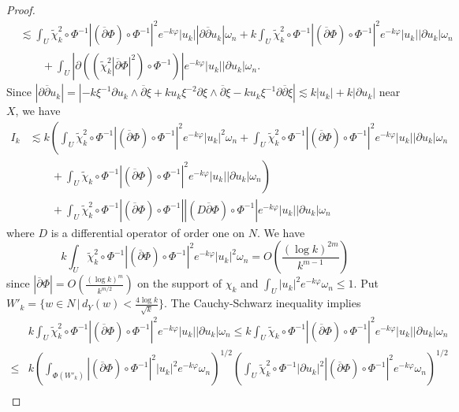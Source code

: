 \documentclass[10pt,a4paper]{amsart}
\begin{document}
\begin{proof}
\begin{align*}
& \lesssim \int_{U} \tilde{\chi}^2_{k}\circ \Phi^{-1} |(\overline{\partial} \Phi)\circ \Phi^{-1}|^2 e^{-k \varphi} |u_{k}| |\partial \overline{\partial} u_{k}| \omega_{n} 
 +  k  \int_{U}  \tilde{\chi}^2_{k}\circ \Phi^{-1} |(\overline{\partial} \Phi)\circ \Phi^{-1}|^2 e^{-k \varphi} |u_{k}| |\partial u_{k}| \omega_{n}   \\ 
& \qquad
+ \int_{U} |\partial \left((\tilde{\chi}^2_{k} |\overline{\partial} \Phi|^2) \circ \Phi^{-1} \right)| e^{-k \varphi}|u_{k}| |\partial u_{k}| \omega_{n}.  
\end{align*}
Since $|\partial \overline{\partial} u_k| =|-k \xi^{-1}\partial u_k \wedge \overline{\partial}\xi + k u_k \xi^{-2}\partial \xi \wedge \overline{\partial} \xi -ku_k \xi^{-1} \partial \overline{\partial} \xi| \lesssim k|u_k| + k |\partial u_k|$ near $X$, we have  
\begin{align*}
I_k & \lesssim 
k \left( \int_{U} \tilde{\chi}_{k}^2 \circ \Phi^{-1} |(\overline{\partial} \Phi) \circ \Phi^{-1}|^2 e^{-k \varphi} |{u}_{k}|^2 \omega_{n} 
+  \int_{U} \tilde{\chi}^2_{k}\circ \Phi^{-1} |(\overline{\partial} \Phi)\circ \Phi^{-1}|^2 e^{-k \varphi} |u_{k}| |\partial u_{k}| \omega_{n} \right.\\
& \qquad 
+\left.\int_{U} \tilde{\chi}_{k}\circ \Phi^{-1} |(\overline{\partial} \Phi)\circ \Phi^{-1}|^2 e^{-k \varphi} |u_{k}| |\partial u_{k}| \omega_{n}\right)\\
&\qquad + \int_{U} \tilde{\chi}^2_{k}\circ \Phi^{-1} |(\overline{\partial} \Phi)\circ\Phi^{-1}| |(D \overline{\partial} \Phi) \circ \Phi^{-1}|e^{-k \varphi} |u_{k}| |\partial u_{k}| \omega_{n}
\end{align*}
where $D$ is a differential operator of order one on $N$.  
We have 
\[
k \int_{U} \tilde{\chi}^2_{k}\circ \Phi^{-1} |(\overline{\partial} \Phi)\circ \Phi^{-1}|^2 e^{-k \varphi} |{u}_{k}|^2 \omega_{n}
= O(\frac{(\log k)^{2m}}{k^{m-1}}) 
\]
since $|\overline{\partial} \Phi| = O(\frac{(\log k)^m}{k^{m/2}})$ on the support of $\chi_k$ and $\int_{U}|u_k|^2 e^{-k\varphi} \omega_n \leq 1$.  
Put $W'_{k} = \{w \in N\, |\, d_{Y}(w) < \frac{4\log k}{\sqrt{k}}\}$.  
The Cauchy-Schwarz inequality implies 
\begin{align*}
& k\int_{U} \tilde{\chi}^2_{k}\circ\Phi^{-1} |(\overline{\partial} \Phi)\circ \Phi^{-1}|^2 e^{-k \varphi} |u_{k}| |\partial u_{k}| \omega_{n} 
\leq k \int_{U} \tilde{\chi}_{k}\circ\Phi^{-1} |(\overline{\partial} \Phi)\circ \Phi^{-1}|^2 e^{-k \varphi} |u_{k}| |\partial u_{k}| \omega_{n}  \\
\leq &
k \left( \int_{\Phi(W'_{k})}|(\overline{\partial} \Phi)\circ \Phi^{-1}|^2 |u_{k}|^2 e^{-k \varphi} \omega_{n} \right)^{1/2} \left(\int_{U} \tilde{\chi}^2_{k}\circ \Phi^{-1} |\partial u_{k}|^2 |(\overline{\partial} \Phi)\circ \Phi^{-1}|^2 e^{-k \varphi} \omega_{n} \right)^{1/2} \\

\end{align*}
\end{proof}
\end{document}
